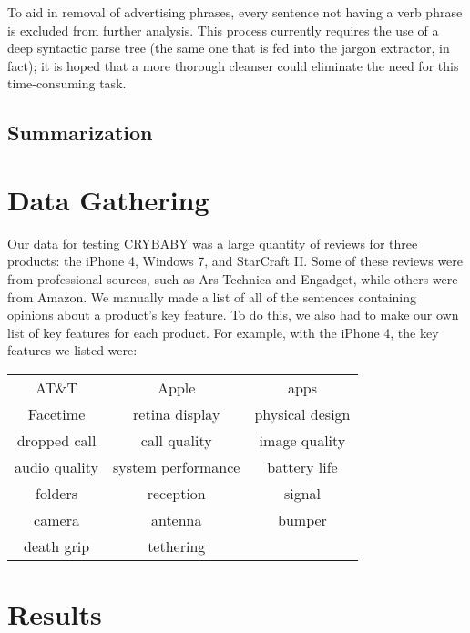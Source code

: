 \documentclass{article}
\begin{document}
To aid in removal of advertising phrases, every sentence not having a verb
phrase is excluded from further analysis. This process currently requires the
use of a deep syntactic parse tree (the same one that is fed into the jargon
extractor, in fact); it is hoped that a more thorough cleanser could eliminate
the need for this time-consuming task.



\subsection{Summarization} %





\section{Data Gathering} %

Our data for testing CRYBABY was a large quantity of reviews for three products:  the iPhone 4, Windows 7, and StarCraft II.  Some of these reviews were from professional sources, such as Ars Technica and Engadget, while others were from Amazon.  We manually made a list of all of the sentences containing opinions about a product's key feature.  To do this, we also had to make our own list of key features for each product.  For example, with the iPhone 4, the key features we listed were:\\\begin{center}\begin{tabular}{ccc}
	AT\&T&Apple&apps\\
	Facetime&retina display&physical design\\
	dropped call&call quality&image quality\\
	audio quality&system performance&battery life\\
	folders&reception&signal\\
	camera&antenna&bumper\\
	death grip&tethering&
\end{tabular}\end{center}


\section{Results} %
\end{document}
